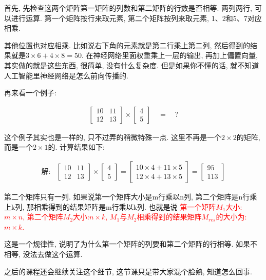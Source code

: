 首先, 先检查这两个矩阵第一矩阵的列数和第二矩阵的行数是否相等. 两列两行, 可以进行运算. 第一个矩阵按行来取元素, 第二个矩阵按列来取元素, 1、2和5、7对应相乘. 

其他位置也对应相乘. 比如说右下角的元素就是第二行乘上第二列, 然后得到的结果就是$3 \times 6 + 4 \times 8 = 50$. 在神经网络里面权重乘上一层的输出, 再加上偏置向量, 其实做的就是这些东西, 很简单, 没有什么复杂度. 但是如果你不懂的话, 就不知道人工智能里神经网络是怎么前向传播的. 

再来看一个例子:

\begin{align*}
	\begin{bmatrix} 10 & 11 \\ 12 & 13 \end{bmatrix}
	\times \begin{bmatrix} 4 \\ 5 \end{bmatrix} \quad = \quad ?
\end{align*}

这个例子其实也是一样的, 只不过弄的稍微特殊一点. 这里不再是一个$2 \times 2$的矩阵, 而是一个$2 \times 1$的. 计算结果如下:

\begin{align*}
    \mbox{解:} 
    & \begin{bmatrix} 10 & 11 \\ 12 & 13 \end{bmatrix}
    \times \begin{bmatrix} 4 \\ 5 \end{bmatrix} 
    = \begin{bmatrix} 10 \times 4 + 11 \times 5 \\ 12 \times 4 + 13 \times 5 \end{bmatrix} 
    =\begin{bmatrix} 95 \\ 113 \end{bmatrix}
\end{align*}

第二个矩阵只有一列. 如果说第一个矩阵大小是m行乘以n列, 第二个矩阵是n行乘上k列, 那相乘得到的结果矩阵是m行乘以k列. 也就是说 \textcolor{red}{第一个矩阵$M_1$大小: $m\times n$, 第二个矩阵$M_2$大小:$n\times k$, $M_1$与$M_2$相乘得到的结果矩阵$M_{res}$的大小为: $m\times k$. }

这是一个规律性, 说明了为什么第一个矩阵的列要和第二个矩阵的行相等. 如果不相等, 没法去做这个运算. 

之后的课程还会继续关注这个细节, 这节课只是带大家混个脸熟, 知道怎么回事. 

